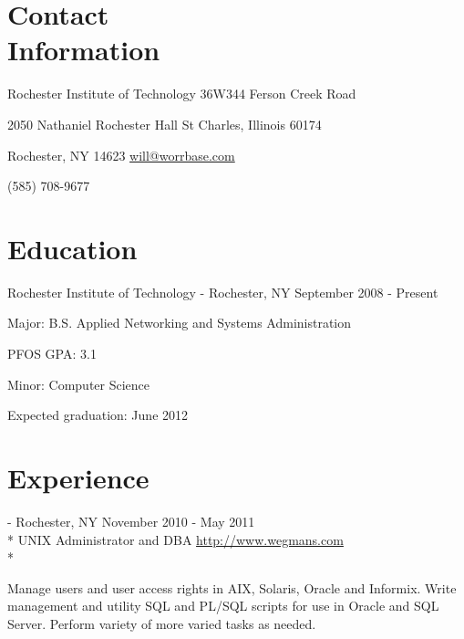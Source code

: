\documentclass[letter,margin,line]{resume}
\newcommand{\rurl}[1]{\hfill {\footnotesize \url{#1}}}
\newcommand{\rdate}[1]{\hfill {\small #1}}
\renewcommand{\employer}[5]{\item[#1] - #2 \rdate{#3} \\* #4 \rurl{#5} \\*}
\begin{document}
\begin{resume}
\section{\mysidestyle Contact \\ Information} \vspace{2mm}
	\begin{asparablank}
		\item Rochester Institute of Technology \hfill 36W344 Ferson Creek Road
		\item 2050 Nathaniel Rochester Hall \hfill St Charles, Illinois 60174
		\item Rochester, NY 14623 \hfill
		\href{mailto:will@worrbase.com}{will@worrbase.com}
		\item (585) 708-9677 \hfill
	\end{asparablank}

\section{\mysidestyle Education}
	\begin{compactdesc}
		\item[Rochester Institute of Technology] - Rochester, NY \rdate{September 2008 - Present}
		\begin{compactitem} { \small
			\item Major: B.S. Applied Networking and Systems Administration
			\item PFOS GPA: 3.1
			\item Minor: Computer Science
			\item Expected graduation: June 2012
		} \end{compactitem}
	\end{compactdesc}

\section{\mysidestyle Experience}
	\begin{asparadesc}
        \employer{Wegmans Food Markets}{Rochester, NY}{November 2010 - May 2011}{UNIX Administrator and DBA}{http://www.wegmans.com}

        \small
        Manage users and user access rights in AIX, Solaris, Oracle and
        Informix. Write management and utility SQL and PL/SQL scripts for use in Oracle and
        SQL Server.  Perform variety of more varied tasks as needed.
		\normalsize
		\\
		

\end{asparadesc}
\end{resume}
\end{document}
